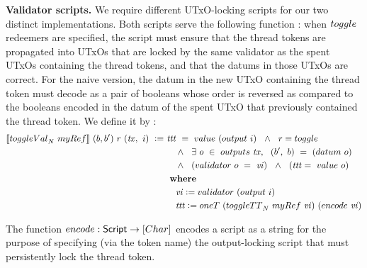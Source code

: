 \textbf{Validator scripts. }
We require different UTxO-locking scripts for our two distinct implementations.
Both scripts serve the following function : when $\toggle$ redeemers are specified,
the script must ensure that the thread
tokens are propagated into UTxOs that are locked by the same validator as
the spent UTxOs containing the thread tokens, and that the datums in those UTxOs
are correct. For the naive version, the datum in the new UTxO containing the thread
token must decode as a pair of booleans whose order is reversed as compared to
the booleans encoded in the datum of the spent UTxO that previously contained the thread token.
We define it by :
  \begin{align*}
    \applyScript{\toggleVal_N~\mathsf{myRef}}~(b, b')~r~(\var{tx},~\var{i})~\leteq &~
    \var{ttt}~ =~ \val~(\fun{output}~i)~~\wedge~~r = \toggle \\
    & ~~~~ \wedge~~\exists~o~\in~\outputs~\var{tx},~~(b',~b)~=~(\datum~o) \\
    & ~~~~ \wedge~~(\validator~o~=~\var{vi}) ~~\wedge ~~(\var{ttt} =~\val~o)\\
    & \where \\
    & ~~~~\var{vi} \leteq \validator~(\fun{output}~i) \\
    & ~~~~\var{ttt} \leteq \mathsf{oneT}~(\toggleTT_N~\mathsf{myRef}~\var{vi} )~(\fun{encode}~\var{vi})
  \end{align*}

The function $\fun{encode} : \Script \to [\type{Char}]$ encodes a script as a string
for the purpose of specifying (via the token name) the output-locking script that
must persistently lock the thread token.


